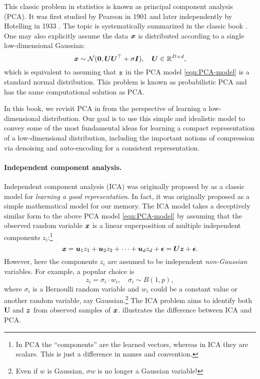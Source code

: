 \documentclass[../../book-main.tex]{subfiles}
\begin{document}
This classic problem in statistics is known as principal component analysis (PCA). It was first studied by Pearson in 1901 \cite{Pearson1901} and later independently by Hotelling in 1933 \cite{Hotelling1933}. The topic is systematically summarized in the classic book \cite{Jolliffe1986,JolliffeI2002}.
One may also explicitly assume the data $\bm{x}$ is distributed according to a single low-dimensional Gaussian:
\begin{equation}
    \bm{x} \sim \mathcal{N}(\boldsymbol{0}, \boldsymbol{U}\boldsymbol{U}^\top + \sigma \bm{I}), \quad \boldsymbol{U} \in \mathbb{R}^{D\times d},
\end{equation}
which is equivalent to assuming that $\bm{z}$ in the PCA model \eqref{eqn:PCA-model} is a standard normal distribution. This problem is known as probabilistic PCA \cite{TippingM1999} and has the same computational solution as PCA. 

In this book, we revisit PCA in  from the perspective of learning a low-dimensional distribution. Our goal is to use this simple and idealistic model to convey some of the most fundamental ideas for learning a compact representation of a low-dimensional distribution, including the important notions of compression via denoising and auto-encoding for a consistent representation.
\paragraph{Independent component analysis.}
Independent component analysis (ICA) was originally proposed by \cite{Ans-1985} as a classic model for \textit{learning a good representation}. In fact, it was originally proposed as a simple mathematical model for our memory. The ICA model takes a deceptively similar form to the above PCA model \eqref{eqn:PCA-model} by assuming that the observed random variable $\bm{x}$ is a linear superposition of multiple independent components $z_i$:\footnote{In PCA the ``components'' are the learned vectors, whereas in ICA they are scalars. This is just a difference in names and convention.}
\begin{equation}
    \bm{x} = \boldsymbol{u}_1 z_1 + \boldsymbol{u}_2 z_2 + \cdots + \boldsymbol{u}_d z_d  + \boldsymbol{\epsilon} =  \boldsymbol{U} \bm{z} + \boldsymbol{\epsilon}.
    \label{eqn:ICA-model}
\end{equation}
However, here the components $z_i$ are assumed to be independent \textit{non-Gaussian} variables. For example, a popular choice is
\begin{equation}
    z_i = \sigma_i \cdot w_i, \quad \sigma_i \sim B(1,p),
    \label{eqn:ICA-modes}
\end{equation}
where $\sigma_i$ is a Bernoulli random variable and $w_i$ could be a constant value or another random variable, say Gaussian.\footnote{Even if $w$ is Gaussian, $\sigma w$ is no longer a Gaussian variable!} The ICA problem aims to identify both $\boldsymbol{U}$ and $\bm{z}$ from observed samples of $\bm{x}$.  illustrates the difference between ICA and PCA.
\end{document}
